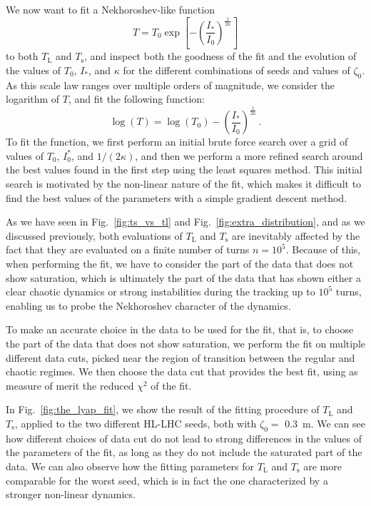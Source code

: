 We now want to fit a Nekhoroshev-like function
\begin{equation}
    T = T_0 \exp\left[-\left(\frac{I_\ast}{I_0}\right)^{\frac{1}{2\kappa}}\right]
\end{equation} 
to both $T_\mathrm{L}$ and $T_\mathrm{s}$, and inspect both the goodness of the fit and the evolution of the values of $T_0$, $I_\ast$, and $\kappa$ for the different combinations of seeds and values of $\zeta_0$. As this scale law ranges over multiple orders of magnitude, we consider the logarithm of $T$, and fit the following function:
\begin{equation}
    \log(T) = \log(T_0) - \left(\frac{I_\ast}{I_0}\right)^{\frac{1}{2\kappa}} \,.
\end{equation}
To fit the function, we first perform an initial brute force search over a grid of values of $T_0$, $I_0^*$, and $1/(2\kappa)$, and then we perform a more refined search around the best values found in the first step using the least squares method. This initial search is motivated by the non-linear nature of the fit, which makes it difficult to find the best values of the parameters with a simple gradient descent method.

As we have seen in Fig.~\ref{fig:ts_vs_tl} and Fig.~\ref{fig:extra_distribution}, and as we discussed previously, both evaluations of $T_\mathrm{L}$ and $T_\mathrm{s}$ are inevitably affected by the fact that they are evaluated on a finite number of turns $n=10^5$. Because of this, when performing the fit, we have to consider the part of the data that does not show saturation, which is ultimately the part of the data that has shown either a clear chaotic dynamics or strong instabilities during the tracking up to $10^5$ turns, enabling us to probe the Nekhoroshev character of the dynamics.

To make an accurate choice in the data to be used for the fit, that is, to choose the part of the data that does not show saturation, we perform the fit on multiple different data cuts, picked near the region of transition between the regular and chaotic regimes. We then choose the data cut that provides the best fit, using as measure of merit the reduced $\chi^2$ of the fit.

In Fig.~\ref{fig:the_lyap_fit}, we show the result of the fitting procedure of $T_\mathrm{L}$ and $T_\mathrm{s}$, applied to the two different HL-LHC seeds, both with $\zeta_0=$ \SI{0.3}{\meter}. We can see how different choices of data cut do not lead to strong differences in the values of the parameters of the fit, as long as they do not include the saturated part of the data. We can also observe how the fitting parameters for $T_\mathrm{L}$ and $T_\mathrm{s}$ are more comparable for the worst seed, which is in fact the one characterized by a stronger non-linear dynamics.

